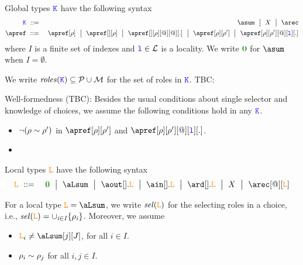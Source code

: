 Global types $\texttt{\textcolor{blue}K}$ have the following syntax
\begin{eqnarray*}
  \aK & \bnfdef & \asum \bnfmid
                  X \bnfmid
                  \arec
  \\
  \apref & \bnfdef & \apref[\arole] \bnfmid
                         \apref[{}][\arole] \bnfmid
                         \apref[{}][\arole][@][@][.] \bnfmid
                         \apref[\arole][\arole'] \bnfmid
                         \apref[\arole][\arole'][@][\aloc][.]
\end{eqnarray*}
where $I$ is a finite set of indexes and $\texttt{\color{blue}l} \in \mathcal{L}$ is a
locality. We write $\nil$ for $\asum$ when $I = \emptyset$.

We write $\it{roles}(\texttt{\textcolor{blue}K}) \subseteq \mathcal{P} \cup \mathcal{M}$ for the set of roles in $\texttt{\textcolor{blue}K}$. 
TBC: 

Well-formedness (TBC): Besides the usual conditions about single selector and knowledge of 
choices,  we assume the following conditions hold in any $\texttt{\textcolor{blue}K}$.

\begin{itemize}
	\item $\neg (\rho \sim \rho')$ in $\apref[\arole][\arole']$ and $\apref[\arole][\arole'][@][\aloc][.]$.
	\item 
\end{itemize}



Local types $\texttt{\textcolor{orange}L}$ have the following syntax
\begin{eqnarray*}
  \aL & \bnfdef & \nil \bnfmid
                  \aLsum \bnfmid
                  \aout[].\aL \bnfmid
                  \ain[].\aL \bnfmid
                  \ard[].\aL \bnfmid
                  X \bnfmid
                  \arec[@][\aL]
\end{eqnarray*}

For a local type $\aL = \aLsum$, we write $\it{sel}(\texttt{\textcolor{orange}L})$ for the selecting roles in a choice, i.e.,
$\it{sel}(\texttt{\textcolor{orange}L}) = \cup_{i\in I}{\{\rho_i\}}$.
%
Moreover, we assume
\begin{itemize}
\item $\aL_i \neq\aLsum[j][J]$, for all $i \in I$.
\item $\rho_i \sim \rho_j$ for all $i,j \in I$.
\end{itemize}

